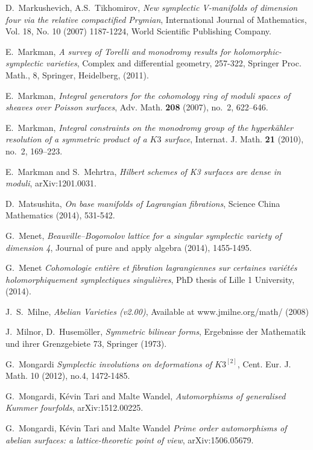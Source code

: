 \begin{thebibliography}{10}
D.~Markushevich, A.S.~Tikhomirov,
\emph{ New symplectic V-manifolds of dimension four via the relative compactified Prymian},
International Journal of Mathematics, Vol. 18, No. 10 (2007) 1187-1224,
World Scientific Publishing Company.  
  
E.~Markman,
\emph{ A survey of Torelli and monodromy results for holomorphic-symplectic varieties},
Complex and differential geometry,
257-322, Springer Proc. Math., 8, Springer, Heidelberg, (2011).  
  
E.~Markman, \emph{Integral generators for the cohomology ring of moduli spaces of
  sheaves over Poisson surfaces}, Adv. Math. \textbf{208} (2007), no.~2,
  622--646.

E.~Markman, \emph{Integral constraints on the monodromy group of the
  hyperk\"ahler resolution of a symmetric product of a {$K3$} surface},
  Internat. J. Math. \textbf{21} (2010), no.~2, 169--223.

E.~Markman and S.~Mehrtra,
\emph{Hilbert schemes of K3 surfaces are dense in moduli},
arXiv:1201.0031.

D.~Matsushita,
\emph{On base manifolds of Lagrangian fibrations},
Science China Mathematics (2014), 531-542.

G.~Menet,
\emph{Beauville--Bogomolov lattice for a singular symplectic variety of dimension 4},
Journal of pure and apply algebra (2014), 1455-1495.

G.~Menet
\emph{Cohomologie enti\`ere et fibration lagrangiennes sur certaines vari\'et\'es holomorphiquement symplectiques singuli\`eres},
PhD thesis of Lille 1 University, (2014).

J.~S.~Milne, \emph{Abelian Varieties (v2.00)}, Available at www.jmilne.org/math/ (2008)  

J.~Milnor, D.~Husem\"oller, \emph{Symmetric bilinear forms}, Ergebnisse der Mathematik
  und ihrer Grenzgebiete 73, Springer (1973).

G.~Mongardi
\emph{Symplectic involutions on deformations of $K3^{[2]}$},
Cent. Eur. J. Math. 
10 (2012), no.4, 1472-1485.

G.~Mongardi, K\'evin Tari and Malte Wandel,
\emph{Automorphisms of generalised Kummer fourfolds},
arXiv:1512.00225. 

G.~Mongardi, K\'evin Tari and Malte Wandel
\emph{Prime order automorphisms of abelian surfaces: a lattice-theoretic point of view},
arXiv:1506.05679. 


\end{thebibliography}
